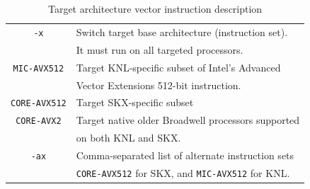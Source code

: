 \documentclass{article}
\begin{document}
\begin{table}[]
\centering
\caption{Target architecture vector instruction description\cite{TACC_Stampede2}}
\label{my-label}
\begin{tabular}{|c|l|}
\hline
\verb+-x+          & Switch target base architecture (instruction set).\\
                   & It must run on all targeted processors.\\ \hline
\verb+MIC-AVX512+  & Target KNL-specific subset of Intel's Advanced\\
                   & Vector Extensions 512-bit instruction.\\ \hline
\verb+CORE-AVX512+ & Target SKX-specific subset \\ \hline
\verb+CORE-AVX2+   & Target native older Broadwell processors supported\\
                   & on both KNL and SKX.\\\hline
\verb+-ax+         & Comma-separated list of alternate instruction sets\\
                   & \verb+CORE-AVX512+ for SKX, and \verb+MIC-AVX512+ for KNL.\\\hline
\end{tabular}
\end{table}
\end{document}
